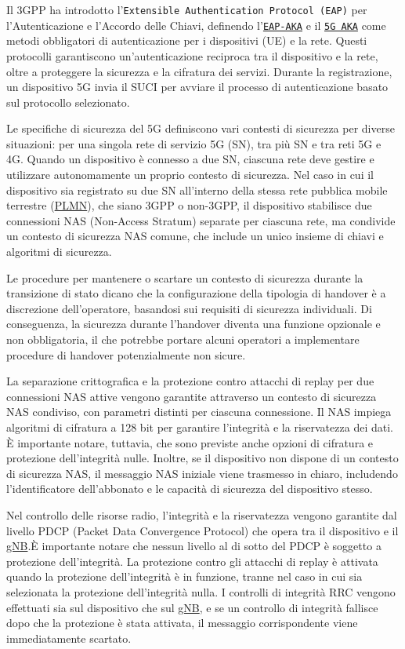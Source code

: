\documentclass[english]{article}
\begin{document}
Il 3GPP ha introdotto l'\texttt{Extensible Authentication Protocol (EAP)} per
l'Autenticazione e l'Accordo delle Chiavi, definendo
l'\texttt{\hyperlink{EAP-AKA}{EAP-AKA}} e il \texttt{\hyperlink{5G AKA}{5G
		AKA}} come metodi obbligatori di autenticazione per i dispositivi (UE) e la
rete. Questi protocolli garantiscono un'autenticazione reciproca tra il
dispositivo e la rete, oltre a proteggere la sicurezza e la cifratura dei
servizi. Durante la registrazione, un dispositivo 5G invia il SUCI per avviare
il processo di autenticazione basato sul protocollo selezionato.

Le specifiche di sicurezza del 5G definiscono vari contesti di sicurezza per
diverse situazioni: per una singola rete di servizio 5G (SN), tra più SN e tra
reti 5G e 4G. Quando un dispositivo è connesso a due SN, ciascuna rete deve
gestire e utilizzare autonomamente un proprio contesto di sicurezza. Nel caso
in cui il dispositivo sia registrato su due SN all'interno della stessa rete
pubblica mobile terrestre (\hyperlink{PLMN}{PLMN}), che siano 3GPP o non-3GPP,
il dispositivo stabilisce due connessioni NAS (Non-Access Stratum) separate per
ciascuna rete, ma condivide un contesto di sicurezza NAS comune, che include un
unico insieme di chiavi e algoritmi di sicurezza.

Le procedure per mantenere o scartare un contesto di sicurezza durante la
transizione di stato dicano che la configurazione della tipologia di handover è
a discrezione dell'operatore, basandosi sui requisiti di sicurezza individuali.
Di conseguenza, la sicurezza durante l'handover diventa una funzione opzionale
e non obbligatoria, il che potrebbe portare alcuni operatori a implementare
procedure di handover potenzialmente non sicure.

La separazione crittografica e la protezione contro attacchi di replay per due
connessioni NAS attive vengono garantite attraverso un contesto di sicurezza
NAS condiviso, con parametri distinti per ciascuna connessione. Il NAS impiega
algoritmi di cifratura a 128 bit per garantire l'integrità e la riservatezza
dei dati. È importante notare, tuttavia, che sono previste anche opzioni di
cifratura e protezione dell'integrità nulle. Inoltre, se il dispositivo non
dispone di un contesto di sicurezza NAS, il messaggio NAS iniziale viene
trasmesso in chiaro, includendo l'identificatore dell'abbonato e le capacità di
sicurezza del dispositivo stesso.

Nel controllo delle risorse radio, l'integrità e la riservatezza vengono
garantite dal livello PDCP (Packet Data Convergence Protocol) che opera tra il
dispositivo e il \hyperlink{gNB}{gNB}.\@ È importante notare che nessun livello
al di sotto del PDCP è soggetto a protezione dell'integrità. La protezione
contro gli attacchi di replay è attivata quando la protezione dell'integrità è
in funzione, tranne nel caso in cui sia selezionata la protezione
dell'integrità nulla. I controlli di integrità RRC vengono effettuati sia sul
dispositivo che sul \hyperlink{gNB}{gNB}, e se un controllo di integrità
fallisce dopo che la protezione è stata attivata, il messaggio corrispondente
viene immediatamente scartato.
\end{document}
